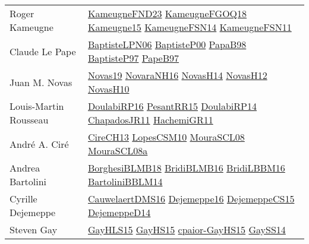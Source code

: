 {\begin{longtable}{p{4cm}p{20cm}}
Roger Kameugne & \href{papers/KameugneFND23.pdf}{KameugneFND23}\cite{KameugneFND23} \href{papers/KameugneFGOQ18.pdf}{KameugneFGOQ18}\cite{KameugneFGOQ18} \href{articles/Kameugne15.pdf}{Kameugne15}\cite{Kameugne15} \href{articles/KameugneFSN14.pdf}{KameugneFSN14}\cite{KameugneFSN14} \href{papers/KameugneFSN11.pdf}{KameugneFSN11}\cite{KameugneFSN11} \\
Claude Le Pape & \href{}{BaptisteLPN06}\cite{BaptisteLPN06} \href{articles/BaptisteP00.pdf}{BaptisteP00}\cite{BaptisteP00} \href{articles/PapaB98.pdf}{PapaB98}\cite{PapaB98} \href{papers/BaptisteP97.pdf}{BaptisteP97}\cite{BaptisteP97} \href{}{PapeB97}\cite{PapeB97} \\
Juan M. Novas & \href{articles/Novas19.pdf}{Novas19}\cite{Novas19} \href{articles/NovaraNH16.pdf}{NovaraNH16}\cite{NovaraNH16} \href{articles/NovasH14.pdf}{NovasH14}\cite{NovasH14} \href{articles/NovasH12.pdf}{NovasH12}\cite{NovasH12} \href{articles/NovasH10.pdf}{NovasH10}\cite{NovasH10} \\
Louis{-}Martin Rousseau & \href{}{DoulabiRP16}\cite{DoulabiRP16} \href{papers/PesantRR15.pdf}{PesantRR15}\cite{PesantRR15} \href{papers/DoulabiRP14.pdf}{DoulabiRP14}\cite{DoulabiRP14} \href{papers/ChapadosJR11.pdf}{ChapadosJR11}\cite{ChapadosJR11} \href{articles/HachemiGR11.pdf}{HachemiGR11}\cite{HachemiGR11} \\
Andr{\'{e}} A. Cir{\'{e}} & \href{papers/CireCH13.pdf}{CireCH13}\cite{CireCH13} \href{articles/LopesCSM10.pdf}{LopesCSM10}\cite{LopesCSM10} \href{papers/MouraSCL08.pdf}{MouraSCL08}\cite{MouraSCL08} \href{papers/MouraSCL08a.pdf}{MouraSCL08a}\cite{MouraSCL08a} \\
Andrea Bartolini & \href{articles/BorghesiBLMB18.pdf}{BorghesiBLMB18}\cite{BorghesiBLMB18} \href{articles/BridiBLMB16.pdf}{BridiBLMB16}\cite{BridiBLMB16} \href{papers/BridiLBBM16.pdf}{BridiLBBM16}\cite{BridiLBBM16} \href{papers/BartoliniBBLM14.pdf}{BartoliniBBLM14}\cite{BartoliniBBLM14} \\
Cyrille Dejemeppe & \href{papers/CauwelaertDMS16.pdf}{CauwelaertDMS16}\cite{CauwelaertDMS16} \href{}{Dejemeppe16}\cite{Dejemeppe16} \href{papers/DejemeppeCS15.pdf}{DejemeppeCS15}\cite{DejemeppeCS15} \href{papers/DejemeppeD14.pdf}{DejemeppeD14}\cite{DejemeppeD14} \\
Steven Gay & \href{papers/GayHLS15.pdf}{GayHLS15}\cite{GayHLS15} \href{papers/GayHS15.pdf}{GayHS15}\cite{GayHS15} \href{papers/cpaior-GayHS15.pdf}{cpaior-GayHS15}\cite{cpaior-GayHS15} \href{papers/GaySS14.pdf}{GaySS14}\cite{GaySS14} \\

\end{longtable}}
